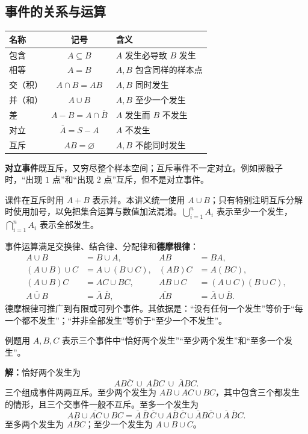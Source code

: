 \documentclass[UTF8,fontset=none,zihao=-4,a4paper]{ctexart}
\newcommand{\term}[1]{\textbf{#1}}
\newcommand{\example}[1]{\begin{infobox}{例题}#1\end{infobox}}
\newcommand{\solution}{\par\noindent\textbf{解：}}
\begin{document}
\subsection{事件的关系与运算}
\begin{center}\begin{tabularx}{\linewidth}{l c Y}
\toprule 名称&记号&含义\\\midrule
包含&$A\subseteq B$&$A$ 发生必导致 $B$ 发生\\
相等&$A=B$&$A,B$ 包含同样的样本点\\
交（积）&$A\cap B=AB$&$A,B$ 同时发生\\
并（和）&$A\cup B$&$A,B$ 至少一个发生\\
差&$A-B=A\cap\overline B$&$A$ 发生而 $B$ 不发生\\
对立&$\overline A=S-A$&$A$ 不发生\\
互斥&$AB=\varnothing$&$A,B$ 不能同时发生\\\bottomrule
\end{tabularx}\end{center}
\term{对立事件}既互斥，又穷尽整个样本空间；互斥事件不一定对立。例如掷骰子时，“出现 $1$ 点”和“出现 $2$ 点”互斥，但不是对立事件。

课件在互斥时用 $A+B$ 表示并。本讲义统一使用 $A\cup B$；只有特别注明互斥分解时使用加号，以免把集合运算与数值加法混淆。$\bigcup_{i=1}^n A_i$ 表示至少一个发生，$\bigcap_{i=1}^n A_i$ 表示全部发生。

事件运算满足交换律、结合律、分配律和\term{德摩根律}：
\begin{align*}
A\cup B&=B\cup A,&AB&=BA,\\
(A\cup B)\cup C&=A\cup(B\cup C),&(AB)C&=A(BC),\\
(A\cup B)C&=AC\cup BC,&AB\cup C&=(A\cup C)(B\cup C),\\
\overline{A\cup B}&=\overline A\,\overline B,&\overline{AB}&=\overline A\cup\overline B.
\end{align*}
德摩根律可推广到有限或可列个事件。其依据是：“没有任何一个发生”等价于“每一个都不发生”；“并非全部发生”等价于“至少一个不发生”。
\example{用 $A,B,C$ 表示三个事件中“恰好两个发生”“至少两个发生”和“至多一个发生”。}
\solution 恰好两个发生为
\[
AB\overline C\ \cup\ A\overline B C\ \cup\ \overline A BC.
\]
三个组成事件两两互斥。至少两个发生为 $AB\cup AC\cup BC$，其中包含三个都发生的情形，且三个交事件一般不互斥。至多一个发生为
\[
\overline{AB\cup AC\cup BC}
=\overline A\,\overline B\,\overline C
\cup A\overline B\,\overline C
\cup\overline A B\overline C
\cup\overline A\,\overline B C.
\]
至多两个发生为 $\overline{ABC}$；至少一个发生为 $A\cup B\cup C$。
\end{document}

